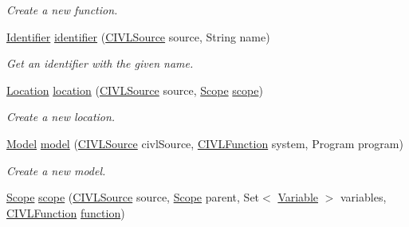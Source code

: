 \begin{DoxyCompactItemize}
\begin{DoxyCompactList}\small\item\em Create a new function. \end{DoxyCompactList}\item 
\hyperlink{interfaceedu_1_1udel_1_1cis_1_1vsl_1_1civl_1_1model_1_1IF_1_1Identifier}{Identifier} \hyperlink{classedu_1_1udel_1_1cis_1_1vsl_1_1civl_1_1model_1_1common_1_1CommonModelFactory_a57d8c7b8ce89a4f3c7a6505ae306d091}{identifier} (\hyperlink{interfaceedu_1_1udel_1_1cis_1_1vsl_1_1civl_1_1model_1_1IF_1_1CIVLSource}{C\+I\+V\+L\+Source} source, String name)
\begin{DoxyCompactList}\small\item\em Get an identifier with the given name. \end{DoxyCompactList}\item 
\hyperlink{interfaceedu_1_1udel_1_1cis_1_1vsl_1_1civl_1_1model_1_1IF_1_1location_1_1Location}{Location} \hyperlink{classedu_1_1udel_1_1cis_1_1vsl_1_1civl_1_1model_1_1common_1_1CommonModelFactory_ae5db41658dca91cece29587770c1e33f}{location} (\hyperlink{interfaceedu_1_1udel_1_1cis_1_1vsl_1_1civl_1_1model_1_1IF_1_1CIVLSource}{C\+I\+V\+L\+Source} source, \hyperlink{interfaceedu_1_1udel_1_1cis_1_1vsl_1_1civl_1_1model_1_1IF_1_1Scope}{Scope} \hyperlink{classedu_1_1udel_1_1cis_1_1vsl_1_1civl_1_1model_1_1common_1_1CommonModelFactory_ace176067c807333f8832ee6b7ffcddfa}{scope})
\begin{DoxyCompactList}\small\item\em Create a new location. \end{DoxyCompactList}\item 
\hyperlink{interfaceedu_1_1udel_1_1cis_1_1vsl_1_1civl_1_1model_1_1IF_1_1Model}{Model} \hyperlink{classedu_1_1udel_1_1cis_1_1vsl_1_1civl_1_1model_1_1common_1_1CommonModelFactory_ae31d37978d4153a38c9809eede37f865}{model} (\hyperlink{interfaceedu_1_1udel_1_1cis_1_1vsl_1_1civl_1_1model_1_1IF_1_1CIVLSource}{C\+I\+V\+L\+Source} civl\+Source, \hyperlink{interfaceedu_1_1udel_1_1cis_1_1vsl_1_1civl_1_1model_1_1IF_1_1CIVLFunction}{C\+I\+V\+L\+Function} system, Program program)
\begin{DoxyCompactList}\small\item\em Create a new model. \end{DoxyCompactList}\item 
\hyperlink{interfaceedu_1_1udel_1_1cis_1_1vsl_1_1civl_1_1model_1_1IF_1_1Scope}{Scope} \hyperlink{classedu_1_1udel_1_1cis_1_1vsl_1_1civl_1_1model_1_1common_1_1CommonModelFactory_ace176067c807333f8832ee6b7ffcddfa}{scope} (\hyperlink{interfaceedu_1_1udel_1_1cis_1_1vsl_1_1civl_1_1model_1_1IF_1_1CIVLSource}{C\+I\+V\+L\+Source} source, \hyperlink{interfaceedu_1_1udel_1_1cis_1_1vsl_1_1civl_1_1model_1_1IF_1_1Scope}{Scope} parent, Set$<$ \hyperlink{interfaceedu_1_1udel_1_1cis_1_1vsl_1_1civl_1_1model_1_1IF_1_1variable_1_1Variable}{Variable} $>$ variables, \hyperlink{interfaceedu_1_1udel_1_1cis_1_1vsl_1_1civl_1_1model_1_1IF_1_1CIVLFunction}{C\+I\+V\+L\+Function} \hyperlink{classedu_1_1udel_1_1cis_1_1vsl_1_1civl_1_1model_1_1common_1_1CommonModelFactory_a8a7968569d8f0b05aa7ed59dfa5368c7}{function})

\end{DoxyCompactItemize}
